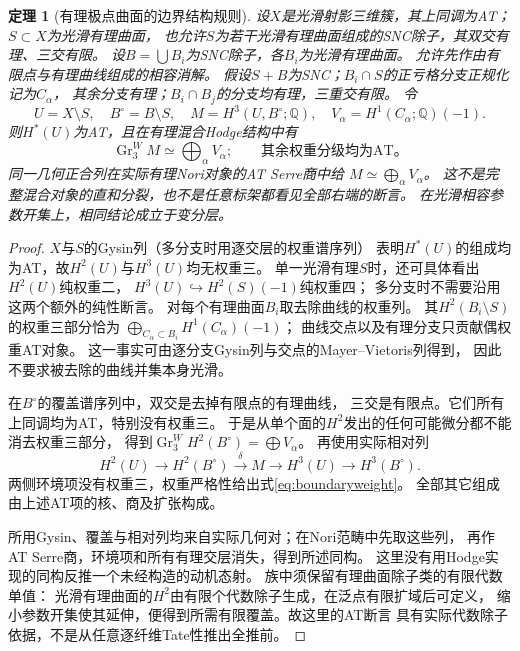 \documentclass[11pt,a4paper]{ctexart}
\theoremstyle{cnplain}\newtheorem{theorem}{定理}[section]
\theoremstyle{definition}\newtheorem{definition}[theorem]{定义}
\theoremstyle{remark}\newtheorem{remark}[theorem]{注}
\newcommand{\Q}{\mathbb Q}\newcommand{\cC}{\mathcal C}
\begin{document}
\begin{theorem}[有理极点曲面的边界结构规则]\label{thm:boundaryweight}
设$X$是光滑射影三维簇，其上同调为AT；$S\subset X$为光滑有理曲面，
也允许$S$为若干光滑有理曲面组成的SNC除子，其双交有理、三交有限。
设$B=\bigcup B_i$为SNC除子，各$B_i$为光滑有理曲面。
允许先作由有限点与有理曲线组成的相容消解。
假设$S+B$为SNC；$B_i\cap S$的正亏格分支正规化记为$C_\alpha$，
其余分支有理；$B_i\cap B_j$的分支均有理，三重交有限。
令
\[
 U=X\setminus S,\quad B^\circ=B\setminus S,\quad
 M=H^3(U,B^\circ;\Q),\quad V_\alpha=H^1(C_\alpha;\Q)(-1).
\]
则$H^*(U)$为AT，且在有理混合Hodge结构中有
\begin{equation}\label{eq:boundaryweight}
 \operatorname{Gr}^W_3 M\simeq\bigoplus_\alpha V_\alpha;
 \qquad\text{其余权重分级均为AT。}
\end{equation}
同一几何正合列在实际有理Nori对象的AT Serre商中给
$M\simeq\bigoplus_\alpha V_\alpha$。
这不是完整混合对象的直和分裂，也不是任意标架都看见全部右端的断言。
在光滑相容参数开集上，相同结论成立于变分层。
\end{theorem}
\begin{proof}
$X$与$S$的Gysin列（多分支时用逐交层的权重谱序列）
表明$H^*(U)$的组成均为AT，故$H^2(U)$与$H^3(U)$均无权重三。
单一光滑有理$S$时，还可具体看出$H^2(U)$纯权重二，
$H^3(U)\hookrightarrow H^2(S)(-1)$纯权重四；
多分支时不需要沿用这两个额外的纯性断言。
对每个有理曲面$B_i$取去除曲线的权重列。
其$H^2(B_i\setminus S)$的权重三部分恰为
$\bigoplus_{C_\alpha\subset B_i}H^1(C_\alpha)(-1)$；
曲线交点以及有理分支只贡献偶权重AT对象。
这一事实可由逐分支Gysin列与交点的Mayer--Vietoris列得到，
因此不要求被去除的曲线并集本身光滑。

在$B^\circ$的覆盖谱序列中，双交是去掉有限点的有理曲线，
三交是有限点。它们所有上同调均为AT，特别没有权重三。
于是从单个面的$H^2$发出的任何可能微分都不能消去权重三部分，
得到$\operatorname{Gr}^W_3H^2(B^\circ)=\bigoplus V_\alpha$。
再使用实际相对列
\begin{equation}\label{eq:boundaryrelative}
 H^2(U)\longrightarrow H^2(B^\circ)
 \overset{\delta}{\longrightarrow}M
 \longrightarrow H^3(U)\longrightarrow H^3(B^\circ).
\end{equation}
两侧环境项没有权重三，权重严格性给出式\eqref{eq:boundaryweight}。
全部其它组成由上述AT项的核、商及扩张构成。

所用Gysin、覆盖与相对列均来自实际几何对；在Nori范畴中先取这些列，
再作AT Serre商，环境项和所有有理交层消失，得到所述同构。
这里没有用Hodge实现的同构反推一个未经构造的动机态射。
族中须保留有理曲面除子类的有限代数单值：
光滑有理曲面的$H^2$由有限个代数除子生成，在泛点有限扩域后可定义，
缩小参数开集使其延伸，便得到所需有限覆盖。故这里的AT断言
具有实际代数除子依据，不是从任意逐纤维Tate性推出全推前。
\end{proof}
\end{document}
